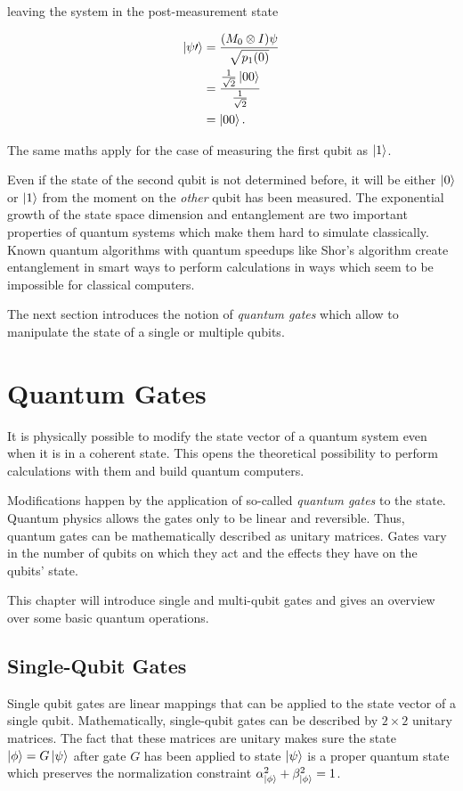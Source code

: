 leaving the system in the post-measurement state

\begin{align}
  \Ket{\psi\prime} &= \frac{(M_0 \otimes I) \psi}{\sqrt{p_1(0)}} \\
                   &= \frac{\frac{1}{\sqrt{2}} \Ket{00}}{\frac{1}{\sqrt{2}}} \\
                   &= \Ket{00}.
\end{align}

The same maths apply for the case of measuring the first qubit as $\Ket{1}$.

Even if the state of the second qubit is not determined before, it will be
either $\Ket{0}$ or $\Ket{1}$ from the moment on the \textit{other} qubit has been measured.
The exponential growth of the state space dimension and entanglement are two
important properties of quantum systems which make them hard to simulate
classically.
Known quantum algorithms with quantum speedups like Shor's algorithm
create entanglement in smart ways to perform calculations in ways which seem
to be impossible for classical computers.

The next section introduces the notion of \textit{quantum gates} which allow to
manipulate the state of a single or multiple qubits.

\section{Quantum Gates}

It is physically possible to modify the state vector of a quantum system even
when it is in a coherent state. This opens the theoretical possibility to perform
calculations with them and build quantum computers.

Modifications happen by the application of so-called \textit{quantum gates} to
the state. Quantum physics allows the gates only to be linear and reversible. Thus,
quantum gates can be mathematically described as unitary matrices. Gates vary in the number of
qubits on which they act and the effects they have on the qubits' state.

This chapter will introduce single and multi-qubit gates and gives an overview
over some basic quantum operations.

\subsection{Single-Qubit Gates}

Single qubit gates are linear mappings that can be applied to the state vector
of a single qubit. Mathematically, single-qubit gates can be described by $2
\times 2$ unitary matrices. The fact that these matrices are unitary makes sure
the state $\Ket{\phi} = G \Ket{\psi}$ after gate $G$ has been applied to state $\Ket{\psi}$ is a
proper quantum state which preserves the normalization constraint
$\alpha_{\Ket{\phi}}^2 + \beta_{\Ket{\phi}}^2 = 1$.

